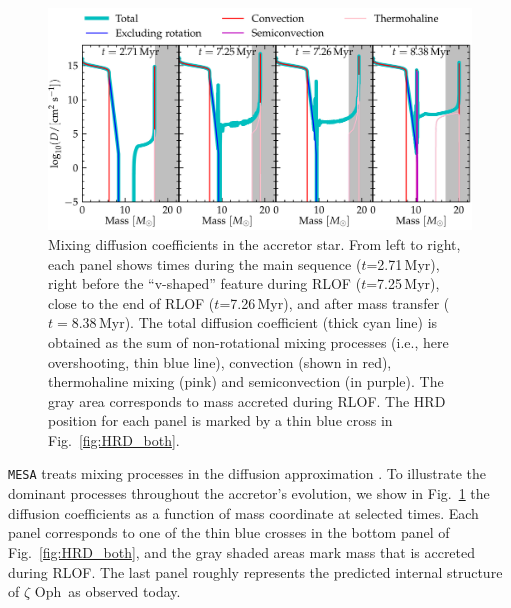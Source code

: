 \documentclass[twocolumn,twocolappendix,trackchanges]{aastex63}
\DeclareRobustCommand{\Figref}[1]{Fig.~\ref{#1}}
\newcommand{\zoph}{$\zeta$ Oph}
\begin{document}
\begin{figure}[htbp]
  \includegraphics[width=\textwidth]{D_mix}
  \caption{Mixing diffusion coefficients in the accretor star. From
    left to right, each panel shows times during the main sequence
    ($t$=2.71\,Myr), right before the ``v-shaped'' feature during RLOF
    ($t$=7.25\,Myr), close to the end of RLOF ($t$=7.26\,Myr), and
    after mass transfer ($t=8.38$\,Myr). The total diffusion
    coefficient (thick cyan line) is obtained as the sum of
    non-rotational mixing processes (i.e., here overshooting, thin
    blue line), convection (shown in red), thermohaline mixing (pink)
    and semiconvection (in purple). The gray area corresponds to mass
    accreted during RLOF. The HRD position for each panel is marked by
    a thin blue cross in \Figref{fig:HRD_both}.}
  \label{fig:D_mix}
\end{figure}

\texttt{MESA} treats mixing processes in the diffusion approximation \citep{paxton:11}.
To illustrate the dominant processes throughout the
accretor's evolution, we show in \Figref{fig:D_mix} the diffusion
coefficients as a function of mass coordinate at selected times. Each
panel corresponds to one of the thin blue crosses in the bottom panel
of \Figref{fig:HRD_both}, and the gray shaded areas mark mass that is
accreted during RLOF. The last panel roughly represents the predicted
internal structure of \zoph\ as observed today.
\end{document}
